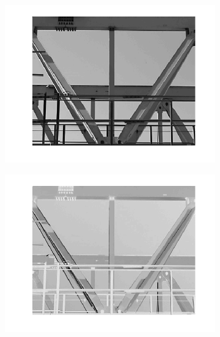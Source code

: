 \documentclass{article}
\begin{document}
\begin{figure}[!ht]
    \centering
    \begin{subfigure}[c]{0.32\linewidth}
        \centering
        \includegraphics[width=\linewidth]{images/1-gantrycrane_c1.png}
    \end{subfigure}
    \hfill
    \begin{subfigure}[c]{0.32\linewidth}
        \centering
        \includegraphics[width=\linewidth]{images/1-gantrycrane_c2.png}
    \end{subfigure}
    \hfill
    \begin{subfigure}[c]{0.32\linewidth}
        \centering

\end{subfigure}
\end{figure}
\end{document}
